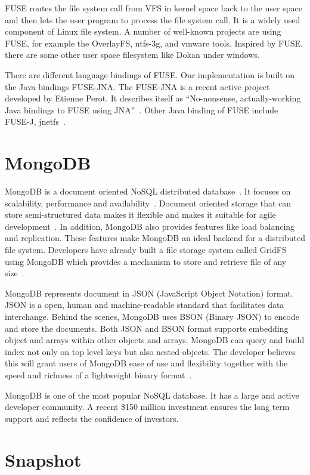     FUSE routes the file system call from VFS in kernel space back to the user space and then lets the user program to process the file system call. It is a widely used component of Linux file system. A number of well-known projects are using FUSE, for example the OverlayFS, ntfs-3g, and vmware tools. Inspired by FUSE, there are some other user space filesystem like Dokan under windows.

    There are different language bindings of FUSE. Our implementation is built on the Java bindings FUSE-JNA. The FUSE-JNA is a recent active project developed by Etienne Perot. It describes itself as ``No-nonsense, actually-working Java bindings to FUSE using JNA''~\cite{fusejna}. Other Java binding of FUSE include FUSE-J, jnetfs~\cite{jnetfs}.

\section{MongoDB}

    MongoDB is a document oriented NoSQL distributed database~\cite{mongo_overview}. It focuses on scalability, performance and availability~\cite{mongo_overview}. Document oriented storage that can store semi-structured data makes it flexible and makes it suitable for agile development~\cite{docdb}. In addition, MongoDB also provides features like load balancing and replication. These features make MongoDB an ideal backend for a distributed file system. Developers have already built a file storage system called GridFS using MongoDB which provides a mechanism to store and retrieve file of any size~\cite{gridfs}.

    MongoDB represents document in JSON (JavaScript Object Notation) format. JSON is a open, human and machine-readable standard that facilitates data interchange. Behind the scenes, MongoDB uses BSON (Binary JSON) to encode and store the documents. Both JSON and BSON format supports embedding object and arrays within other objects and arrays. MongoDB can query and build index not only on top level keys but also nested objects. The developer believes this will grant users of MongoDB ease of use and flexibility together with the speed and richness of a lightweight binary format~\cite{bson}.

    MongoDB is one of the most popular NoSQL database. It has a large and active developer community. A recent \$150 million investment ensures the long term support and reflects the confidence of investors.

\section{Snapshot}


